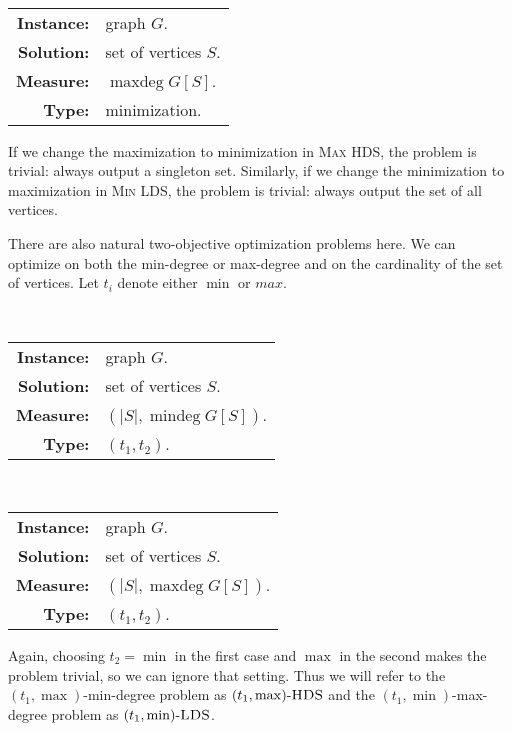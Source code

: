 \documentclass{article}
\newcommand{\dash}{\textnormal{-}}
\DeclareMathOperator{\mindeg}{mindeg}
\DeclareMathOperator{\maxdeg}{maxdeg}
\begin{document}
\begin{definition}
  \mbox{} \\
  \begin{tabular}{r p{9.5cm}}
    \textbf{Instance:} & graph $G$. \\
    \textbf{Solution:} & set of vertices $S$. \\
    \textbf{Measure:} & $\maxdeg G[S]$. \\
    \textbf{Type:} & minimization.
  \end{tabular}
\end{definition}

If we change the maximization to minimization in \textsc{Max HDS}, the problem is trivial: always output a singleton set.
Similarly, if we change the minimization to maximization in \textsc{Min LDS}, the problem is trivial: always output the set of all vertices.

There are also natural two-objective optimization problems here.
We can optimize on both the min-degree or max-degree and on the cardinality of the set of vertices.
Let $t_i$ denote either $\min$ or $max$.

\begin{definition}
  \mbox{} \\
  \begin{tabular}{r p{9.5cm}}
    \textbf{Instance:} & graph $G$. \\
    \textbf{Solution:} & set of vertices $S$. \\
    \textbf{Measure:} & $(|S|, \mindeg G[S])$. \\
    \textbf{Type:} & $(t_1, t_2)$.
  \end{tabular}
\end{definition}

\begin{definition}
  \mbox{} \\
  \begin{tabular}{r p{9.5cm}}
    \textbf{Instance:} & graph $G$. \\
    \textbf{Solution:} & set of vertices $S$. \\
    \textbf{Measure:} & $(|S|, \maxdeg G[S])$. \\
    \textbf{Type:} & $(t_1, t_2)$.
  \end{tabular}
\end{definition}

Again, choosing $t_2 = \min$ in the first case and $\max$ in the second makes the problem trivial, so we can ignore that setting.
Thus we will refer to the $(t_1, \max)$-min-degree problem as $(t_1, \max)\dash\textsc{HDS}$ and the $(t_1, \min)$-max-degree problem as $(t_1, \min)\dash\textsc{LDS}$.
\end{document}
